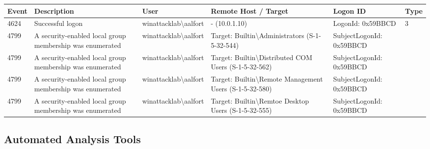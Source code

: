 \begin{table}[h]
\begin{tabularx}{\textwidth}{|l|X|l|X|X|l|}
\hline
Event & Description & User & Remote Host / Target & Logon ID & Type \\
\hline
4624 & Successful logon & winattacklab\textbackslash{}aalfort & - (10.0.1.10) & LogonId: 0x59BBCD & 3 \\
\hline
4799 & A security-enabled local group membership was enumerated & winattacklab\textbackslash{}aalfort & Target: Builtin\textbackslash{}Administrators (S-1-5-32-544) & SubjectLogonId: 0x59BBCD & \\
\hline
4799 & A security-enabled local group membership was enumerated & winattacklab\textbackslash{}aalfort & Target: Builtin\textbackslash{}Distributed COM Users (S-1-5-32-562) & SubjectLogonId: 0x59BBCD & \\
\hline
4799 & A security-enabled local group membership was enumerated & winattacklab\textbackslash{}aalfort & Target: Builtin\textbackslash{}Remote Management Users (S-1-5-32-580) & SubjectLogonId: 0x59BBCD & \\
\hline
4799 & A security-enabled local group membership was enumerated & winattacklab\textbackslash{}aalfort & Target: Builtin\textbackslash{}Remtoe Desktop Users (S-1-5-32-555) & SubjectLogonId: 0x59BBCD & \\
\hline
\end{tabularx}
\end{table}

\subsection{Automated Analysis Tools}

